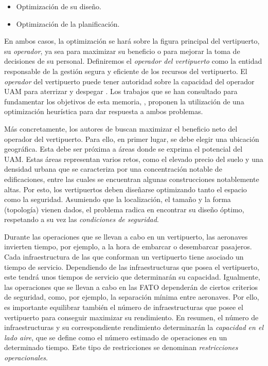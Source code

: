 \documentclass[12pt,a4paper]{book}
\begin{document}
\begin{itemize}
	\item Optimización de su diseño.
	\item Optimización de la planificación.  
\end{itemize}

En ambos casos, la optimización se hará sobre la figura principal del vertipuerto, su \textsl{operador}, ya sea para maximizar su beneficio o para mejorar la toma de decisiones de su personal. Definiremos el \textsl{operador del vertipuerto} como la entidad responsable de la gestión segura y eficiente de los recursos del vertipuerto. El \textsl{operador} del vertipuerto puede tener autoridad sobre la capacidad del operador UAM para aterrizar y despegar \cite{levitt_uam_2021}. Los trabajos que se han consultado para fundamentar los objetivos de esta memoria, \cite{park_vertiport_2022, espejo-diaz_heuristic_2023}, proponen la utilización de una optimización heurística para dar respuesta a ambos problemas.  

Más concretamente, los autores de \cite{park_vertiport_2022} buscan maximizar el beneficio neto del operador del vertipuerto. Para ello, en primer lugar, se debe elegir una ubicación geográfica. Esta debe ser próxima a áreas donde se exprima el potencial del UAM. Estas áreas representan varios retos, como el elevado precio del suelo y una densidad urbana que se caracteriza por una concentración notable de edificaciones, entre las cuales se encuentran algunas construcciones notablemente altas. Por esto, los vertipuertos deben diseñarse optimizando tanto el espacio como la seguridad. Asumiendo que la localización, el tamaño y la forma (topología) vienen dados, el problema radica en encontrar su diseño óptimo, respetando a su vez las \textsl{condiciones de seguridad}. 

Durante las operaciones que se llevan a cabo en un vertipuerto, las aeronaves invierten tiempo, por ejemplo, a la hora de embarcar o desembarcar pasajeros. Cada infraestructura de las que conforman un vertipuerto tiene asociado un tiempo de servicio. Dependiendo de las infraestructuras que posea el vertipuerto, este tendrá unos tiempos de servicio que determinarán su capacidad. Igualmente, las operaciones que se llevan a cabo en las FATO dependerán de ciertos criterios de seguridad, como, por ejemplo, la separación mínima entre aeronaves. Por ello, es importante equilibrar también el número de infraestructuras que posee el vertipuerto para conseguir maximizar su rendimiento. En resumen, el número de infraestructuras y su correspondiente rendimiento determinarán la \textsl{capacidad en el lado aire}, que se define como el número estimado de operaciones en un determinado tiempo. Este tipo de restricciones se denominan \textsl{restricciones operacionales}.  
\end{document}
